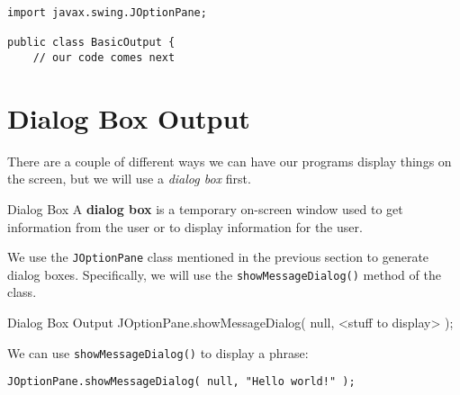 \begin{lstlisting}
import javax.swing.JOptionPane;

public class BasicOutput {
    // our code comes next
\end{lstlisting}

\section{Dialog Box Output}
There are a couple of different ways we can have our programs display things on the screen, but we will use a \textit{dialog box} first.

\begin{defn}{Dialog Box}
A \textbf{dialog box} is a temporary on-screen window used to get information from the user or to display information for the user.
\end{defn}

We use the \lstinline{JOptionPane} class mentioned in the previous section to generate dialog boxes.  Specifically, we will use the \lstinline{showMessageDialog()} method of the class.

\begin{javaformat}{Dialog Box Output}
JOptionPane.showMessageDialog( null, <stuff to display> );
\end{javaformat}

We can use \lstinline{showMessageDialog()} to display a phrase:

\begin{lstlisting}
JOptionPane.showMessageDialog( null, "Hello world!" );
\end{lstlisting}
